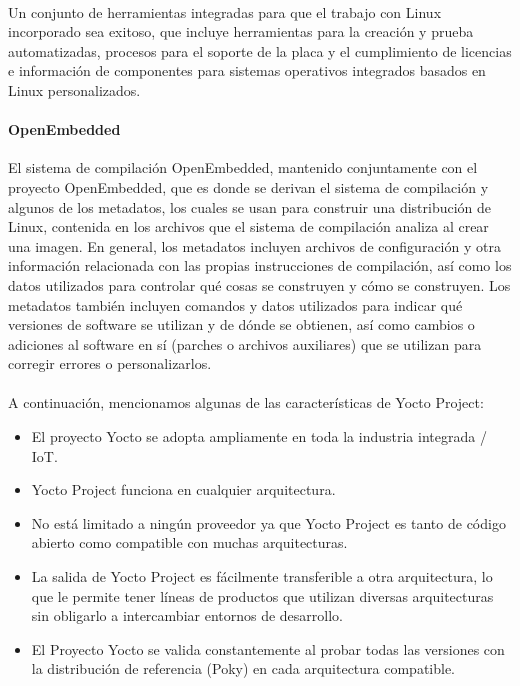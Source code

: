\paragraph{}
Un conjunto de herramientas integradas para que el trabajo con Linux incorporado sea exitoso, que incluye herramientas para la creación y prueba automatizadas, procesos para el soporte de la placa y el cumplimiento de licencias e información de componentes para sistemas operativos integrados basados en Linux personalizados.
\paragraph{OpenEmbedded}
El sistema de compilación OpenEmbedded, mantenido conjuntamente con el proyecto OpenEmbedded, que es donde se derivan el sistema de compilación y algunos de los metadatos, los cuales se usan para construir una distribución de Linux, contenida en los archivos que el sistema de compilación analiza al crear una imagen. En general, los metadatos incluyen archivos de configuración y otra información relacionada con las propias instrucciones de compilación, así como los datos utilizados para controlar qué cosas se construyen y cómo se construyen. Los metadatos también incluyen comandos y datos utilizados para indicar qué versiones de software se utilizan y de dónde se obtienen, así como cambios o adiciones al software en sí (parches o archivos auxiliares) que se utilizan para corregir errores o personalizarlos.
\paragraph{}
A continuación, mencionamos algunas de las características de Yocto Project:
\begin{itemize}
	\item El proyecto Yocto se adopta ampliamente en toda la industria integrada / IoT.
    \item Yocto Project funciona en cualquier arquitectura.
    \item No está limitado a ningún proveedor ya que Yocto Project es tanto de código abierto como compatible con muchas arquitecturas.
    \item La salida de Yocto Project es fácilmente transferible a otra arquitectura, lo que le permite tener líneas de productos que utilizan diversas arquitecturas sin obligarlo a intercambiar entornos de desarrollo.
    \item El Proyecto Yocto se valida constantemente al probar todas las versiones con la distribución de referencia (Poky) en cada arquitectura compatible.
\end{itemize}
